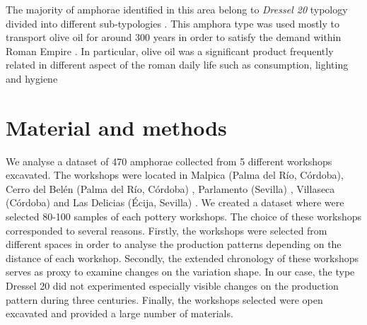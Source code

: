 \documentclass[review]{elsarticle}
\begin{document}

The majority of amphorae identified in this area belong to \emph{Dressel 20} typology divided into different sub-typologies \citep{berni_millet_epigrafianforica_2008, martin-kilcher_romischen_1994}. This amphora type was used mostly to transport olive oil for around 300 years in order to satisfy the demand within Roman Empire \citep{rodriguez_economioleicola_1977}. In particular, olive oil was a significant product frequently related in different aspect of the roman daily life such as consumption, lighting and hygiene %




\section{Material and methods}

We analyse a dataset of 470 amphorae collected from 5 different workshops excavated. The workshops were located in Malpica (Palma del R\'io, C\'ordoba), Cerro del Bel\'en (Palma del R\'io, C\'ordoba) \citep{diaz_trujillo_excavacion_1992}, Parlamento (Sevilla) \citep{garcia_vargas_anforas_2000}, Villaseca (C\'ordoba)\citep{garcia_vargas_enrique_excavacion_????} and Las Delicias (\'Ecija, Sevilla) \citep{fernandez_excavacion_2001,_atelier_2014}. We created a dataset where were selected 80-100 samples of each pottery workshops. The choice of these workshops corresponded to several reasons. Firstly, the workshops were selected from different spaces in order to analyse the production patterns depending on the distance of each workshop. Secondly, the extended chronology of these workshops serves as proxy to examine changes on the variation shape. In our case, the type Dressel 20 did not experimented especially visible changes on the production pattern during three centuries.%
Finally, the workshops selected were open excavated and provided a large number of materials.   
\end{document}
